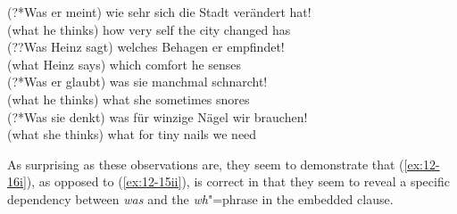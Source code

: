 \documentclass[output=paper]{langsci/langscibook}
\begin{document}
\begin{exe}
\ex
\label{ex:12-40}
\begin{xlist}
\end{xlist}
\ex
\label{ex:12-41}
\begin{xlist}
\ex
\label{ex:12-41a}
\gll
(?*Was er meint) wie sehr sich die Stadt verändert hat! \\
(\phantom{?*}what he thinks) how very self the city changed has \\
\ex
\label{ex:12-41b}
\gll
(??Was Heinz sagt) welches Behagen er empfindet! \\
(\phantom{??}what Heinz says) which comfort he senses \\
\ex
\label{ex:12-41c}
\gll
(?*Was er glaubt) was sie manchmal schnarcht! \\
(\phantom{?*}what he thinks) what she sometimes snores \\
\ex
\label{ex:12-41d}
\gll
(?*Was sie denkt) was für winzige Nägel wir brauchen! \\
(\phantom{?*}what she thinks) what for tiny nails we need \\
\end{xlist}
\end{exe}
As surprising as these observations are, they seem to demonstrate
that (\ref{ex:12-16i}), as opposed to (\ref{ex:12-15ii}), is correct in that they seem to
reveal a specific dependency between \textit{was} and the \emph{wh}"=phrase
in the embedded clause.
\end{document}

